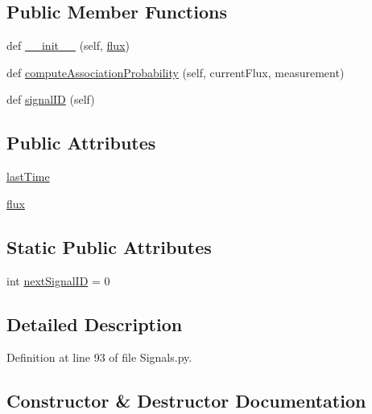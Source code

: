 \subsection*{Public Member Functions}
\begin{DoxyCompactItemize}
\item 
def \hyperlink{classSignals_1_1PoissonSource_a18f7e4d0f7f8385d195736a37fc0a445}{\+\_\+\+\_\+init\+\_\+\+\_\+} (self, \hyperlink{classSignals_1_1PoissonSource_a26e7bf25b1d9195bfded2a3ad6790bce}{flux})
\item 
def \hyperlink{classSignals_1_1PoissonSource_a8e7a6023e7ee53ed0b5b81c7d0aa361c}{compute\+Association\+Probability} (self, current\+Flux, measurement)
\item 
def \hyperlink{classSignals_1_1SignalSource_a85016cca8a7f1e188d314ced50577d05}{signal\+ID} (self)
\end{DoxyCompactItemize}
\subsection*{Public Attributes}
\begin{DoxyCompactItemize}
\item 
\hyperlink{classSignals_1_1PoissonSource_a66b0f3fb48cc130b6b07d7427092a522}{last\+Time}
\item 
\hyperlink{classSignals_1_1PoissonSource_a26e7bf25b1d9195bfded2a3ad6790bce}{flux}
\end{DoxyCompactItemize}
\subsection*{Static Public Attributes}
\begin{DoxyCompactItemize}
\item 
int \hyperlink{classSignals_1_1SignalSource_abcff0d069f17cb5ebe3eff15b6283a64}{next\+Signal\+ID} = 0
\end{DoxyCompactItemize}


\subsection{Detailed Description}


Definition at line 93 of file Signals.\+py.



\subsection{Constructor \& Destructor Documentation}
